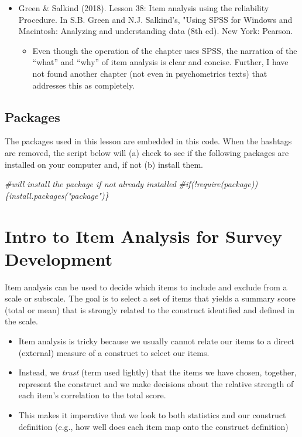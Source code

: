 \documentclass[
  english,
]{book}
\newenvironment{Shaded}{\begin{snugshade}}{\end{snugshade}}
\newcommand{\CommentTok}[1]{\textcolor[rgb]{0.56,0.35,0.01}{\textit{#1}}}
\providecommand{\tightlist}{%
  \setlength{\itemsep}{0pt}\setlength{\parskip}{0pt}}
\begin{document}
\begin{itemize}
\tightlist
\item
  Green \& Salkind (2018). Lesson 38: Item analysis using the reliability Procedure. In S.B. Green and N.J. Salkind's, "Using SPSS for Windows and Macintosh: Analyzing and understanding data (8th ed). New York: Pearson.

  \begin{itemize}
  \tightlist
  \item
    Even though the operation of the chapter uses SPSS, the narration of the ``what'' and ``why'' of item analysis is clear and concise. Further, I have not found another chapter (not even in psychometrics texts) that addresses this as completely.
  \end{itemize}
\end{itemize}

\hypertarget{packages-5}{%
\subsection{Packages}\label{packages-5}}

The packages used in this lesson are embedded in this code. When the hashtags are removed, the script below will (a) check to see if the following packages are installed on your computer and, if not (b) install them.

\begin{Shaded}
\begin{Highlighting}[]
\CommentTok{\#will install the package if not already installed}
\CommentTok{\#if(!require(package))\{install.packages("package")\}}
\end{Highlighting}
\end{Shaded}

\hypertarget{intro-to-item-analysis-for-survey-development}{%
\section{Intro to Item Analysis for Survey Development}\label{intro-to-item-analysis-for-survey-development}}

Item analysis can be used to decide which items to include and exclude from a scale or subscale. The goal is to select a set of items that yields a summary score (total or mean) that is strongly related to the construct identified and defined in the scale.

\begin{itemize}
\tightlist
\item
  Item analysis is tricky because we usually cannot relate our items to a direct (external) measure of a construct to select our items.
\item
  Instead, we \emph{trust} (term used lightly) that the items we have chosen, together, represent the construct and we make decisions about the relative strength of each item's correlation to the total score.
\item
  This makes it imperative that we look to both statistics and our construct definition (e.g., how well does each item map onto the construct definition)
\end{itemize}
\end{document}
